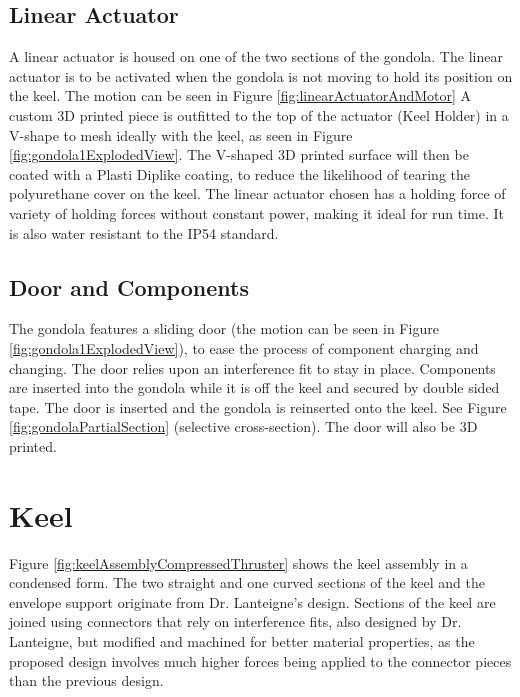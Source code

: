 \documentclass[../main.tex]{subfiles}
\begin{document}
\subsection{Linear Actuator}
A linear actuator is housed on one of the two sections of the gondola. The linear actuator is to be activated when the gondola is not moving to hold its position on the keel. The motion can be seen in Figure \ref{fig:linearActuatorAndMotor} A custom 3D printed piece is outfitted to the top of the actuator (Keel Holder) in a V-shape to mesh ideally with the keel, as seen in Figure \ref{fig:gondola1ExplodedView}. The V-shaped 3D printed surface will then be coated with a Plasti Dip\textregistered  like coating, to reduce the likelihood of tearing the polyurethane cover on the keel.  The  linear actuator chosen has a holding force of variety of holding forces without constant power, making it ideal for run time. It is also water resistant to the IP54 standard. 
\\
\subsection{Door and Components}
The gondola features a sliding door (the motion can be seen in Figure \ref{fig:gondola1ExplodedView}), to ease the process of component charging and changing. The door relies upon an interference fit to stay in place. Components are inserted into the gondola while it is off the keel and secured by double sided tape. The door is inserted and the gondola is reinserted onto the keel. See Figure \ref{fig:gondolaPartialSection} (selective cross-section). The door will also be 3D printed.
\\
\section{Keel}
Figure \ref{fig:keelAssemblyCompressedThruster} shows the keel assembly in a condensed form. The two straight and one curved sections of the keel and the envelope support originate from Dr. Lanteigne's design. Sections of the keel are joined using connectors that rely on interference fits, also designed by Dr. Lanteigne, but modified and machined for better material properties, as the proposed design involves much higher forces being applied to the connector pieces than the previous design. 
\end{document}
